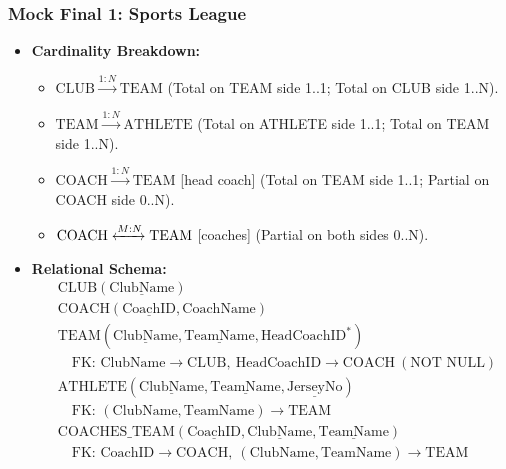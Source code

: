 \documentclass[10pt,a4paper]{article}
\begin{document}
\subsubsection*{Mock Final 1: Sports League}
\begin{itemize}
  \item \textbf{Cardinality Breakdown:}
  \begin{itemize}
    \item $\mathrm{CLUB} \xrightarrow{1:N} \mathrm{TEAM}$ (Total on TEAM side 1..1; Total on CLUB side 1..N).
    \item $\mathrm{TEAM} \xrightarrow{1:N} \mathrm{ATHLETE}$ (Total on ATHLETE side 1..1; Total on TEAM side 1..N).
    \item $\mathrm{COACH} \xrightarrow{1:N} \mathrm{TEAM}$ [head coach] (Total on TEAM side 1..1; Partial on COACH side 0..N).
    \item $\mathrm{COACH} \xleftrightarrow{M:N} \mathrm{TEAM}$ [coaches] (Partial on both sides 0..N).
  \end{itemize}
  \item \textbf{Relational Schema:}
  \begin{align*}
    &\mathrm{CLUB}(\underline{\mathrm{ClubName}})\\
    &\mathrm{COACH}(\underline{\mathrm{CoachID}}, \mathrm{CoachName})\\
    &\mathrm{TEAM}(\underline{\mathrm{ClubName}}, \underline{\mathrm{TeamName}}, \mathrm{HeadCoachID}^*)\\
    &\quad \text{FK: } \mathrm{ClubName} \to \mathrm{CLUB},\ \mathrm{HeadCoachID} \to \mathrm{COACH}\ (\text{NOT NULL})\\
    &\mathrm{ATHLETE}(\underline{\mathrm{ClubName}}, \underline{\mathrm{TeamName}}, \underline{\mathrm{JerseyNo}})\\
    &\quad \text{FK: } (\mathrm{ClubName}, \mathrm{TeamName}) \to \mathrm{TEAM}\\
    &\mathrm{COACHES\_TEAM}(\underline{\mathrm{CoachID}}, \underline{\mathrm{ClubName}}, \underline{\mathrm{TeamName}})\\
    &\quad \text{FK: } \mathrm{CoachID} \to \mathrm{COACH},\ (\mathrm{ClubName}, \mathrm{TeamName}) \to \mathrm{TEAM}
  \end{align*}
\end{itemize}
\end{document}
